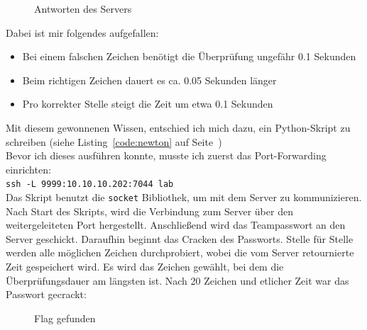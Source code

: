 \documentclass[12pt, a4paper, titlepage, oneside]{scrartcl}
\begin{document}
	\begin{figure}[h!]
		\centering
		\caption{Antworten des Servers}
		\label{fig:newton1}
	\end{figure}

	Dabei ist mir folgendes aufgefallen:
	\begin{itemize}
		\item Bei einem falschen Zeichen benötigt die Überprüfung ungefähr 0.1 Sekunden

		\item Beim richtigen Zeichen dauert es ca. 0.05 Sekunden länger

		\item Pro korrekter Stelle steigt die Zeit um etwa 0.1 Sekunden
	\end{itemize}
	Mit diesem gewonnenen Wissen, entschied ich mich dazu, ein Python-Skript zu schreiben
	(siehe Listing~\ref*{code:newton} auf Seite~\pageref*{code:newton}) \\ Bevor ich
	dieses ausführen konnte, musste ich zuerst das Port-Forwarding einrichten: \\ \lstinline{ssh -L 9999:10.10.10.202:7044 lab}
	\\ Das Skript benutzt die \lstinline{socket} Bibliothek, um mit dem Server zu
	kommunizieren. Nach Start des Skripts, wird die Verbindung zum Server über den
	weitergeleiteten Port hergestellt. Anschließend wird das Teampasswort an den Server
	geschickt. Daraufhin beginnt das Cracken des Passworts. Stelle für Stelle werden
	alle möglichen Zeichen durchprobiert, wobei die vom Server retournierte Zeit
	gespeichert wird. Es wird das Zeichen gewählt, bei dem die Überprüfungsdauer
	am längsten ist. Nach 20 Zeichen und etlicher Zeit war das Passwort gecrackt:

	\begin{figure}[h!]
		\centering
		\caption{Flag gefunden}
		\label{fig:newton2}
	\end{figure}
\end{document}
